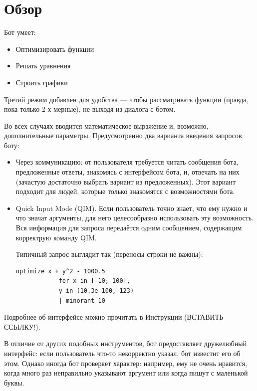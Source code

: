 \documentclass[11pt]{article}
\begin{document}
    \section{Обзор}\label{sec:overview}

    Бот умеет:
    \begin{itemize}
        \item Оптимизировать функции
        \item Решать уравнения
        \item Строить графики
    \end{itemize}

    Третий режим добавлен для удобства — чтобы рассматривать функции (правда, пока только 2-х мерные),
    не выходя из диалога с ботом.

    Во всех случаях вводится математическое выражение и, возможно, дополнительные параметры.
    Предусмотренно два варианта введения запросов боту:
    \begin{itemize}
        \item Через коммуникацию: от пользователя требуется читать сообщения бота, предложенные ответы, знакомясь с интерфейсом бота,
              и, отвечать на них (зачастую достаточно выбрать вариант из предложенных).
              Этот вариант подходит для людей, которые только знакомятся с возможностями бота.
        \item Quick Input Mode (QIM).
              Если пользователь точно знает, что ему нужно и что значат аргументы, для него целесообразно использовать эту возможность.
              Вся информация для запроса передаётся одним сообщением, содержащим корректрую команду QIM.

        Типичный запрос выглядит так (переносы строки не важны): \newline

        \begin{lstlisting}[label={lst:QIM-example}]
            optimize x + y^2 - 1000.5
            for x in [-10; 100],
            y in (10.3e-100, 123)
            | minorant 10
        \end{lstlisting}

    \end{itemize}

    Подробнее об интерфейсе можно прочитать в Инструкции (ВСТАВИТЬ ССЫЛКУ!).


    В отличие от других подобных инструментов, бот предоставляет дружелюбный интерфейс: если пользователь что-то некорректно указал,
    бот известит его об этом.
    Однако иногда бот проверяет характер: например, ему не очень нравится, когда много раз неправильно указывают аргумент или
    когда пишут с маленькой буквы.
\end{document}
